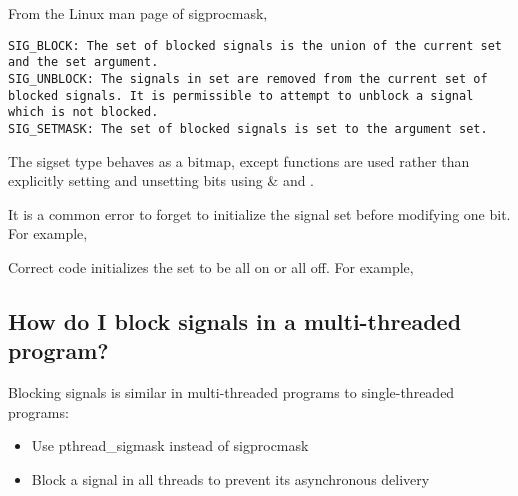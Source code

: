 From the Linux man page of sigprocmask,

\begin{verbatim}
SIG_BLOCK: The set of blocked signals is the union of the current set and the set argument.
SIG_UNBLOCK: The signals in set are removed from the current set of blocked signals. It is permissible to attempt to unblock a signal which is not blocked.
SIG_SETMASK: The set of blocked signals is set to the argument set.
\end{verbatim}

The sigset type behaves as a bitmap, except functions are used rather
than explicitly setting and unsetting bits using \& and \textbar{}.

It is a common error to forget to initialize the signal set before
modifying one bit. For example,

\begin{Shaded}
\begin{Highlighting}[]
\end{Highlighting}
\end{Shaded}

Correct code initializes the set to be all on or all off. For example,

\begin{Shaded}
\begin{Highlighting}[]

\end{Highlighting}
\end{Shaded}

\subsection{How do I block signals in a multi-threaded
program?}\label{how-do-i-block-signals-in-a-multi-threaded-program}

Blocking signals is similar in multi-threaded programs to
single-threaded programs:

\begin{itemize}
\itemsep1pt\parskip0pt
\item
  Use pthread\_sigmask instead of sigprocmask
\item
  Block a signal in all threads to prevent its asynchronous delivery
\end{itemize}

